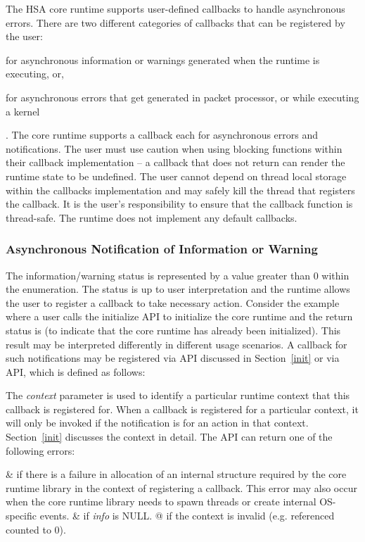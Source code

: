 The HSA core runtime supports user-defined callbacks to handle
asynchronous errors. There are two different categories of callbacks
that can be registered by the user: \begin{inparaenum}[(i)] \item
for asynchronous information or warnings generated when the runtime
is executing, or, \item for asynchronous errors that get generated
in packet processor, or while executing a kernel \end{inparaenum}.
The core runtime supports a callback each for asynchronous errors
and notifications.
The user must use caution when using blocking functions within their
callback implementation -- a callback that does not return can
render the runtime state to be undefined. The user cannot depend on
thread local storage within the callbacks implementation and may
safely kill the thread that registers the callback. It is the user's
responsibility to ensure that the callback function is thread-safe.
The runtime does not implement any default callbacks.

\subsubsection{Asynchronous Notification of Information or
Warning}\label{asynnotif}

The information/warning status is represented by a value greater
than 0 within the  enumeration. The status is
up to user interpretation and the runtime allows the user to
register a callback to take necessary action. Consider the example
where a user calls the initialize API to initialize the core runtime
and the return status is
 (to indicate that
the core runtime has already been initialized). This result may be
interpreted differently in different usage scenarios. A callback for
such notifications may be registered via  API
discussed in Section~\ref{init} or via
 API, which is defined
as follows:



The {\itshape context} parameter is used to identify a particular
runtime context that this callback is registered for. When a
callback is registered for a particular context, it will only be
invoked if the notification is for an action in that context.
Section~\ref{init} discusses the context in detail. The
 API can return one of
the following errors:
\begin{easylist}
&  if there is a failure
in allocation of an internal structure required by the core runtime
library in the context of registering a callback. This error may
also occur when the core runtime library needs to spawn threads or
create internal OS-specific events. 
&  
if {\itshape info} is NULL.
@  if the context is invalid
(e.g. referenced counted to 0). 
\end{easylist}

